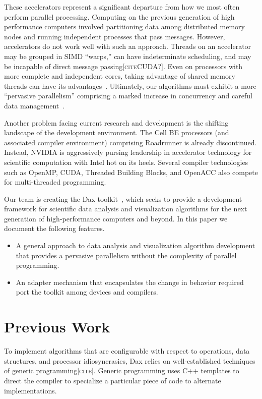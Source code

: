\documentclass[conference]{IEEEtran}
\newcommand*{\lcite}[1]{~\cite{#1}}
\newcommand{\fix}[1]{{\color{red}\textsc{[#1]}}}
\begin{document}
These accelerators represent a significant departure from how we most often
perform parallel processing.  Computing on the previous generation of high
performance computers involved partitioning data among distributed memory
nodes and running independent processes that pass messages.  However,
accelerators do not work well with such an approach.  Threads on an
accelerator may be grouped in SIMD ``warps,'' can have indeterminate
scheduling, and may be incapable of direct message passing\fix{citeCUDA?}.
Even on processors with more complete and independent cores, taking
advantage of shared memory threads can have its
advantages\lcite{Camp2010,Howison2011}.  Ultimately, our algorithms must
exhibit a more ``pervasive parallelism'' comprising a marked increase in
concurrency and careful data
management\lcite{ScientificDiscoveryExascale2011,ExascaleRoadMap}.

Another problem facing current research and development is the shifting
landscape of the development environment.  The Cell BE processors (and
associated compiler environment) comprising Roadrunner is already
discontinued.  Instead, NVIDIA is aggressively pursing leadership in
accelerator technology for scientific computation with Intel hot on its
heels.  Several compiler technologies such as OpenMP, CUDA, Threaded
Building Blocks, and OpenACC also compete for multi-threaded programming.

Our team is creating the Dax toolkit\lcite{Moreland2011:LDAV}, which seeks
to provide a development framework for scientific data analysis and
visualization algorithms for the next generation of high-performance
computers and beyond.  In this paper we document the following features.
\begin{itemize}
\item A general approach to data analysis and visualization algorithm
  development that provides a pervasive parallelism without the complexity
  of parallel programming.
\item An adapter mechanism that encapsulates the change in behavior
  required port the toolkit among devices and compilers.
\end{itemize}

\section{Previous Work}
\label{sec:PreviousWork}

\noindent
To implement algorithms that are configurable with respect to operations,
data structures, and processor idiosyncrasies, Dax relies on
well-established techniques of generic programming\fix{cite}.  Generic
programming uses C++ templates to direct the compiler to specialize a
particular piece of code to alternate implementations.
\end{document}
